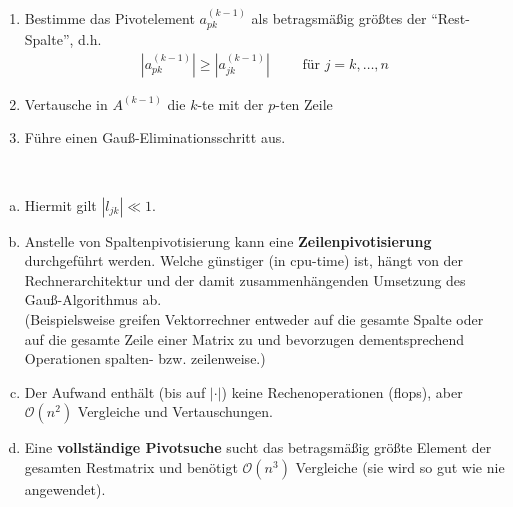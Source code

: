 \begin{enumerate}[1.]
\item Bestimme das Pivotelement $a_{pk}^{(k-1)}$ 
  als betragsmäßig größtes der \enquote{Rest-Spalte}, d.h.
  \begin{gather*}
    |a_{pk}^{(k-1)}|\geq |a_{jk}^{(k-1)}| \qquad  \text{ für } j=k,\ldots , n
  \end{gather*}
\item Vertausche in $A^{(k-1)}$ die $k$-te mit der $p$-ten Zeile
\item Führe einen Gauß-Eliminationsschritt aus.
\end{enumerate}

\begin{Beme}~
  \begin{enumerate}[a)]
  \item Hiermit gilt $|l_{jk}| \ll 1$.
  \item Anstelle von Spaltenpivotisierung kann eine \textbf{Zeilenpivotisierung}
    durchgeführt werden.
    Welche günstiger (in cpu-time) ist, hängt von der Rechnerarchitektur und
    der damit zusammenhängenden Umsetzung des Gauß-Algorithmus ab.\\
    (Beispielsweise greifen Vektorrechner entweder auf die gesamte Spalte
    oder auf die gesamte Zeile einer Matrix zu und bevorzugen dementsprechend
    Operationen spalten- bzw. zeilenweise.)
  \item Der Aufwand enthält (bis auf $|\cdot |$) keine Rechenoperationen (flops),
    aber $\mathcal{O}(n^2)$ Vergleiche und Vertauschungen.
  \item Eine \textbf{vollständige Pivotsuche} sucht das betragsmäßig größte Element der gesamten Restmatrix und benötigt $\mathcal{O}(n^3) $ Vergleiche
    (sie wird so gut wie nie angewendet).
  \end{enumerate}
\end{Beme}

